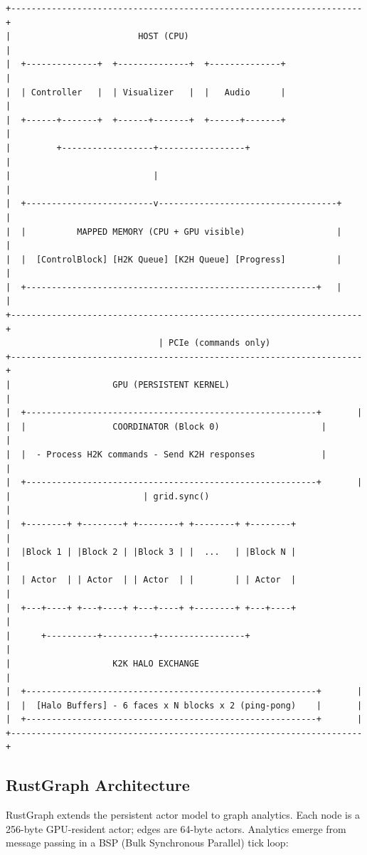 \documentclass[11pt,a4paper]{article}
\begin{document}
\begin{Verbatim}[fontsize=\small,frame=single,framesep=3mm]
+---------------------------------------------------------------------+
|                         HOST (CPU)                                  |
|  +--------------+  +--------------+  +--------------+               |
|  | Controller   |  | Visualizer   |  |   Audio      |               |
|  +------+-------+  +------+-------+  +------+-------+               |
|         +------------------+-----------------+                       |
|                            |                                         |
|  +-------------------------v-----------------------------------+    |
|  |          MAPPED MEMORY (CPU + GPU visible)                  |    |
|  |  [ControlBlock] [H2K Queue] [K2H Queue] [Progress]          |    |
|  +---------------------------------------------------------+   |    |
+---------------------------------------------------------------------+
                              | PCIe (commands only)
+---------------------------------------------------------------------+
|                    GPU (PERSISTENT KERNEL)                          |
|  +---------------------------------------------------------+       |
|  |                 COORDINATOR (Block 0)                    |       |
|  |  - Process H2K commands - Send K2H responses             |       |
|  +---------------------------------------------------------+       |
|                          | grid.sync()                              |
|  +--------+ +--------+ +--------+ +--------+ +--------+             |
|  |Block 1 | |Block 2 | |Block 3 | |  ...   | |Block N |             |
|  | Actor  | | Actor  | | Actor  | |        | | Actor  |             |
|  +---+----+ +---+----+ +---+----+ +--------+ +---+----+             |
|      +----------+----------+-----------------+                      |
|                    K2K HALO EXCHANGE                                |
|  +---------------------------------------------------------+       |
|  |  [Halo Buffers] - 6 faces x N blocks x 2 (ping-pong)    |       |
|  +---------------------------------------------------------+       |
+---------------------------------------------------------------------+
\end{Verbatim}

\subsection{RustGraph Architecture}

RustGraph extends the persistent actor model to graph analytics. Each node is a 256-byte GPU-resident actor; edges are 64-byte actors. Analytics emerge from message passing in a BSP (Bulk Synchronous Parallel) tick loop:
\end{document}
